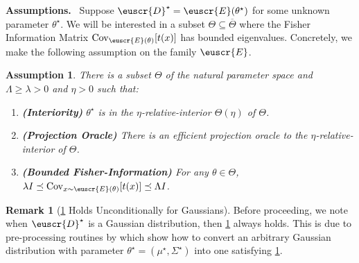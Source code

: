 \documentclass[11pt]{article}
\theoremstyle{plain}
\newtheorem{assumption}{Assumption}
\theoremstyle{definition}
\newtheorem{remark}[theorem]{Remark}
\theoremstyle{remark}
\newcommand{\cov}{\ensuremath{\operatornamewithlimits{\rm Cov}}}
\newcommand{\customcal}[1]{\euscr{#1}}
\newcommand{\cD}{\customcal{D}}
\newcommand{\cE}{\customcal{E}}
\renewcommand{\paragraph}[1]{\medskip \noindent\textbf{#1}~}
\newcommand{\cDtrue}{\cD^\star}
\newcommand{\muStar}{\mu^\star}
\newcommand{\SigmaStar}{\Sigma^\star}
\begin{document}
            \paragraph{Assumptions.}
            Suppose $\cDtrue = \cE(\theta^\star)$ for some unknown parameter $\theta^\star$.
            We will be interested in a subset $\Theta\subseteq \overline{\Theta}$ where the Fisher Information Matrix $\cov_{\cE(\theta)}[t(x)]$ has bounded eigenvalues.
            Concretely, we make the following assumption on the family $\cE$. 
            \begin{assumption}\label{asmp:exponentialFamily:appendix}
                There is a subset $\Theta$ of the natural parameter space and $\Lambda\geq \lambda > 0$ and $\eta>0$ such that:
                \begin{enumerate}
                    \item \textbf{(Interiority)}           %
                        $\theta^\star$ is in the $\eta$-relative-interior $\Theta(\eta)$ of $\Theta$.
                    \item \textbf{(Projection Oracle)} There is an efficient projection oracle to the $\eta$-relative-interior of $\Theta$.
                    \item \textbf{(Bounded Fisher-Information)} For any $\theta\in \Theta$,
                    $\lambda I \preceq \cov_{x\sim \cE(\theta)}[t(x)]\preceq \Lambda I$.
                \end{enumerate}
            \end{assumption}
            \begin{remark}[\cref{asmp:exponentialFamily:appendix} Holds Unconditionally for Gaussians]
                Before proceeding, we note when $\cDtrue$ is a Gaussian distribution, then \cref{asmp:exponentialFamily:appendix} always holds.
                This is due to pre-processing routines by \citet{lee2024unknown} which show how to convert an arbitrary Gaussian distribution with parameter $\theta^\star=(\muStar,\SigmaStar)$ into one satisfying \cref{asmp:exponentialFamily:appendix}.
            \end{remark}
 
\end{document}
